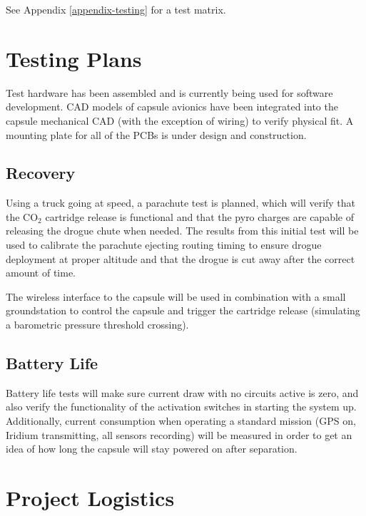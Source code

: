 \documentclass{article}
\begin{document}
See Appendix \ref{appendix-testing} for a test matrix.


\section{Testing Plans}
\label{sec:testplans}

Test hardware has been assembled and is currently being used for software development. CAD models of capsule avionics have been integrated into the capsule mechanical CAD (with the exception of wiring) to verify physical fit. A mounting plate for all of the PCBs is under design and construction.

\subsection{Recovery}
Using a truck going at speed, a parachute test is planned, which will verify that the CO$_2$ cartridge release is functional and that the pyro charges are capable of releasing the drogue chute when needed. The results from this initial test will be used to calibrate the parachute ejecting routing timing to ensure drogue deployment at proper altitude and that the drogue is cut away after the correct amount of time.

The wireless interface to the capsule will be used in combination with a small groundstation to control the capsule and trigger the cartridge release (simulating a barometric pressure threshold crossing).


\subsection{Battery Life}
Battery life tests will make sure current draw with no circuits active is zero, and also verify the functionality of the activation switches in starting the system up. Additionally, current consumption when operating a standard mission (GPS on, Iridium transmitting, all sensors recording) will be measured in order to get an idea of how long the capsule will stay powered on after separation. 



\section{Project Logistics}
\label{sec:logistics}
\end{document}
